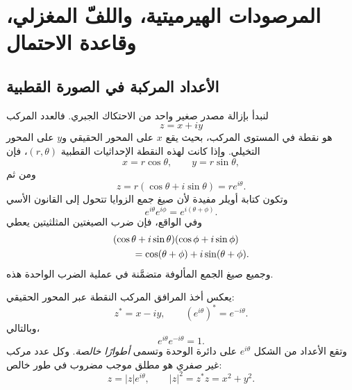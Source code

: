 \chapter{المرصودات الهيرميتية، واللفّ المغزلي، وقاعدة الاحتمال}


\section{الأعداد المركبة في الصورة القطبية}

لنبدأ بإزالة مصدر صغير واحد من الاحتكاك الجبري. فالعدد المركب
\begin{equation}
  z=x+iy
\end{equation}
هو نقطة في المستوى المركب، بحيث يقع \(x\) على المحور الحقيقي و\(y\) على المحور التخيلي. وإذا كانت لهذه النقطة الإحداثيات القطبية \((r,\theta)\)، فإن
\begin{equation}
  x=r\cos\theta,
  \qquad
  y=r\sin\theta,
\end{equation}
ومن ثم
\begin{equation}
  z=r(\cos\theta+i\sin\theta)=re^{i\theta}.
  \label{eq:l03-polar-form}
\end{equation}
وتكون كتابة أويلر مفيدة لأن صيغ جمع الزوايا تتحول إلى القانون الأسي
\begin{equation}
  e^{i\theta}e^{i\phi}
  =e^{i(\theta+\phi)}.
  \label{eq:l03-phase-product}
\end{equation}
وفي الواقع، فإن ضرب الصيغتين المثلثيتين يعطي
\begin{align}
& (\cos\theta+i\sin\theta)(\cos\phi+i\sin\phi)
\notag\\
&\qquad=\cos(\theta+\phi)+i\sin(\theta+\phi).
\end{align}
وجميع صيغ الجمع المألوفة متضمَّنة في عملية الضرب الواحدة هذه.

يعكس أخذ المرافق المركب النقطة عبر المحور الحقيقي:
\begin{equation}
  z^*=x-iy,
  \qquad
  (e^{i\theta})^*=e^{-i\theta}.
\end{equation}
وبالتالي،
\begin{equation}
  e^{i\theta}e^{-i\theta}=1.
\end{equation}
وتقع الأعداد من الشكل \(e^{i\theta}\) على دائرة الوحدة وتسمى \emph{أطوارًا خالصة}. وكل عدد مركب غير صفري هو مطلق موجب مضروب في طور خالص:
\begin{equation}
  z=|z|e^{i\theta},
  \qquad
  |z|^2=z^*z=x^2+y^2.
  \label{eq:l03-modulus-phase}
\end{equation}

